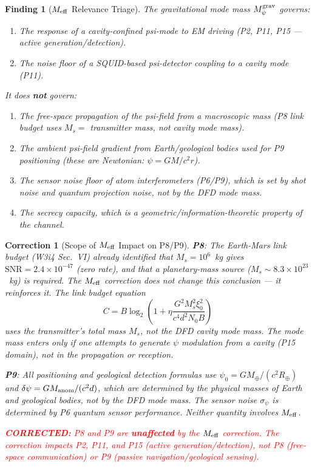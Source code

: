 \documentclass[aps,prd,twocolumn,superscriptaddress,nofootinbib]{revtex4-2}
\newcommand{\SNR}{\mathrm{SNR}}
\newcommand{\corrected}[1]{\textcolor{red}{\textbf{CORRECTED:} #1}}
\newtheorem{finding}{Finding}
\newtheorem{correction}{Correction}
\begin{document}
\begin{finding}[$M_{\rm eff}$ Relevance Triage]
\label{find:triage}
The gravitational mode mass $M_\psi^{\rm grav}$ governs:
\begin{enumerate}
\item The response of a \emph{cavity-confined} psi-mode to EM driving
  (P2, P11, P15 --- active generation/detection).
\item The noise floor of a SQUID-based psi-detector coupling to a
  cavity mode (P11).
\end{enumerate}

It does \textbf{not} govern:
\begin{enumerate}
\item[(a)] The free-space propagation of the psi-field from a
  macroscopic mass (P8 link budget uses $M_s = $ transmitter mass,
  not cavity mode mass).
\item[(b)] The ambient psi-field gradient from Earth/geological bodies
  used for P9 positioning (these are Newtonian: $\psi = GM/c^2 r$).
\item[(c)] The sensor noise floor of atom interferometers (P6/P9),
  which is set by shot noise and quantum projection noise, not by
  the DFD mode mass.
\item[(d)] The secrecy capacity, which is a geometric/information-theoretic
  property of the channel.
\end{enumerate}
\end{finding}

\begin{correction}[Scope of $M_{\rm eff}$ Impact on P8/P9]
\label{corr:scope}
\textbf{P8}: The Earth-Mars link budget (W3i4 Sec.~VI) already identified
that $M_s = 10^6$~kg gives $\SNR = 2.4\times10^{-47}$ (zero rate), and
that a planetary-mass source ($M_s \sim 8.3\times10^{23}$~kg) is required.
The $M_{\rm eff}$ correction does not change this conclusion --- it
reinforces it. The link budget equation
\begin{equation}
C = B\log_2\!\left(1 + \eta \frac{G^2 M_s^2 \xi_0^2}{c^4 d^2 N_0 B}\right)
\label{eq:link-budget-recalled}
\end{equation}
uses the \emph{transmitter's total mass} $M_s$, not the DFD cavity mode
mass. The mode mass enters only if one attempts to \emph{generate} $\psi$
modulation from a cavity (P15 domain), not in the propagation or reception.

\textbf{P9}: All positioning and geological detection formulas use
$\psi_0 = GM_\oplus/(c^2 R_\oplus)$ and
$\delta\psi = G M_{\rm anom}/(c^2 d)$, which are determined by the
\emph{physical masses} of Earth and geological bodies, not by the
DFD mode mass. The sensor noise $\sigma_\psi$ is determined by P6
quantum sensor performance. Neither quantity involves $M_{\rm eff}$.

\corrected{P8 and P9 are \textbf{unaffected} by the $M_{\rm eff}$
correction. The correction impacts P2, P11, and P15 (active
generation/detection), not P8 (free-space communication) or P9
(passive navigation/geological sensing).}
\end{correction}
\end{document}
